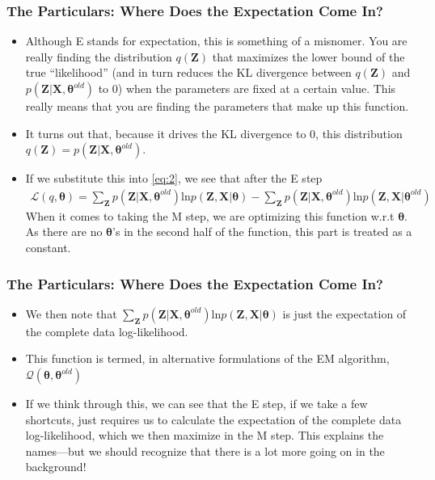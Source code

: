 \documentclass{beamer}
\begin{document}
\begin{frame}
\frametitle{The Particulars: Where Does the Expectation Come In?}
\begin{itemize}
	\item Although E stands for expectation, this is something of a misnomer. You are really finding the distribution $q(\mathbf{Z})$ that maximizes the lower bound of the true ``likelihood'' (and in turn reduces the KL divergence between $q(\mathbf{Z})$ and $p(\mathbf{Z}|\mathbf{X}, \boldsymbol{\theta}^{old})$ to 0) when the parameters are fixed at a certain value. This really means that you are finding the parameters that make up this function. 
	\item It turns out that, because it drives the KL divergence to 0, this distribution $q(\mathbf{Z}) = p(\mathbf{Z}|\mathbf{X}, \boldsymbol{\theta}^{old})$.
	\item If we substitute this into \ref{eq:2}, we see that after the E step
	\begin{align*}
		\mathcal{L}(q,\boldsymbol{\theta}) = \sum_{\mathbf{Z}}p(\mathbf{Z}|\mathbf{X}, \boldsymbol{\theta}^{old})\text{ln}p(\mathbf{Z},\mathbf{X}| \boldsymbol{\theta}) - \sum_{\mathbf{Z}}p(\mathbf{Z}|\mathbf{X}, \boldsymbol{\theta}^{old})\text{ln}p(\mathbf{Z},\mathbf{X}| \boldsymbol{\theta}^{old})
	\end{align*}
	When it comes to taking the M step, we are optimizing this function w.r.t $\boldsymbol{\theta}$. As there are no $\boldsymbol{\theta}$'s in the second half of the function, this part is treated as a constant.
\end{itemize}
\end{frame}

\begin{frame}
\frametitle{The Particulars: Where Does the Expectation Come In?}
\begin{itemize}
	\item We then note that $\sum_{\mathbf{Z}}p(\mathbf{Z}|\mathbf{X}, \boldsymbol{\theta}^{old})\text{ln}p(\mathbf{Z},\mathbf{X}| \boldsymbol{\theta})$ is just the expectation of the complete data log-likelihood.
	\item This function is termed, in alternative formulations of the EM algorithm, $\mathcal{Q}(\boldsymbol{\theta}, \boldsymbol{\theta}^{old})$
	\item If we think through this, we can see that the E step, if we take a few shortcuts, just requires us to calculate the expectation of the complete data log-likelihood, which we then maximize in the M step. This explains the names---but we should recognize that there is a lot more going on in the background!   
\end{itemize}
\end{frame}
\end{document}
